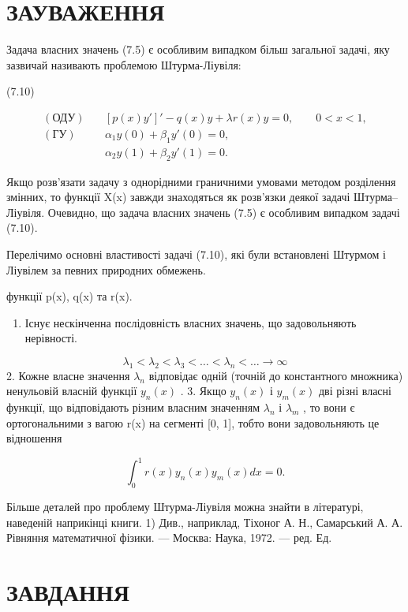 \section{ЗАУВАЖЕННЯ}\label{ux437ux430ux443ux432ux430ux436ux435ux43dux43dux44f-5}

Задача власних значень (7.5) є особливим випадком більш загальної задачі, яку зазвичай називають проблемою Штурма-Ліувіля:

(7.10)

\[
\begin{aligned}
(\text{ОДУ})\quad & [p(x)y']' - q(x)y + \lambda r(x)y = 0,\qquad 0<x<1,\\
(\text{ГУ})\quad & \alpha_1 y(0) + \beta_1 y'(0)=0,\\
& \alpha_2 y(1) + \beta_2 y'(1)=0.
\end{aligned}
\]

Якщо розв'язати задачу з однорідними граничними умовами методом розділення змінних, то функції X(x) завжди знаходяться як розв'язки деякої задачі Штурма--Ліувіля. Очевидно, що задача власних значень (7.5) є особливим випадком задачі (7.10).

Перелічимо основні властивості задачі (7.10), які були встановлені Штурмом і Ліувілем за певних природних обмежень.

функції p(x), q(x) та r(x).

\begin{enumerate}
\def\labelenumi{\arabic{enumi}.}
\tightlist
\item
  Існує нескінченна послідовність власних значень, що задовольняють нерівності.
\end{enumerate}

\[
\lambda_1 < \lambda_2 < \lambda_3 < \ldots < \lambda_n < \ldots \to \infty
\] 2. Кожне власне значення \(\lambda_n\) відповідає одній (точній до константного множника) ненульовій власній функції \(y_n(x)\) . 3. Якщо \(y_n(x)\) і \(y_m(x)\) дві різні власні функції, що відповідають різним власним значенням \(\lambda_n\) і \(\lambda_m\) , то вони є ортогональними з вагою r(x) на сегменті {[}0, 1{]}, тобто вони задовольняють це відношення

\[
\int_{0}^{1} r(x) y_{n}(x) y_{m}(x) dx = 0.
\]

Більше деталей про проблему Штурма-Ліувіля можна знайти в літературі, наведеній наприкінці книги. 1) Див., наприклад, Тіхоног А. Н., Самарський А. А. Рівняння математичної фізики. --- Москва: Наука, 1972. --- ред. Ед.

\section{ЗАВДАННЯ}\label{ux437ux430ux432ux434ux430ux43dux43dux44f-6}

